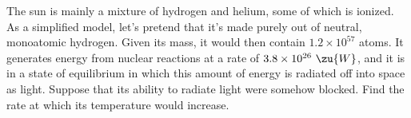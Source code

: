 The sun is mainly a mixture of hydrogen and helium, some of which is
ionized. As a simplified model, let's pretend that it's made purely out
of neutral, monoatomic hydrogen. Given its mass, it would then contain $1.2\times10^{57}$ atoms.
It generates energy from nuclear reactions at a rate of $3.8\times10^{26}\ \zu{W}$,
and it is in a state of equilibrium in which this amount of energy is radiated off
into space as light. Suppose that its ability to radiate light were somehow blocked.
Find the rate at which its temperature would increase.
\answercheck
